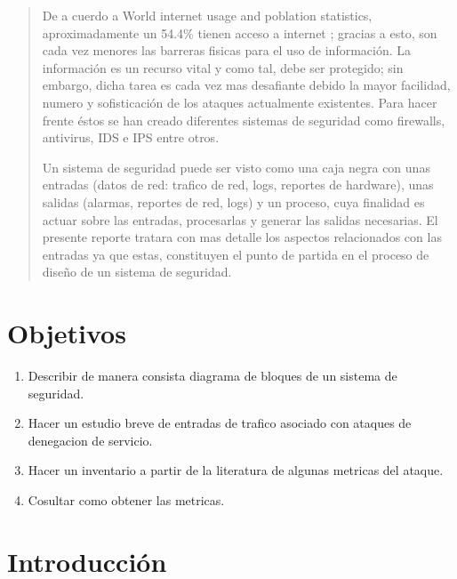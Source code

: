 \documentclass[12pt]{article}
\begin{document}
\tableofcontents
\newpage

\begin{abstract}

De a cuerdo a World internet usage and poblation statistics, aproximadamente un 54.4\% tienen acceso a internet \citep{internet_stats}; gracias a esto, son cada vez menores las barreras fisicas para el uso de información. La información es un recurso vital y como tal, debe ser protegido; sin embargo, dicha tarea es cada vez mas desafiante debido la mayor facilidad, numero y sofisticación de los ataques actualmente existentes. Para hacer frente éstos se han creado diferentes sistemas de seguridad como firewalls, antivirus, IDS e IPS entre otros.

Un sistema de seguridad puede ser visto como una caja negra con unas entradas (datos de red: trafico de red, logs, reportes de hardware), unas salidas (alarmas, reportes de red, logs) y un proceso, cuya finalidad es actuar sobre las entradas, procesarlas y generar las salidas necesarias. El presente reporte tratara con mas detalle los aspectos relacionados con las entradas ya que estas, constituyen el punto de partida en el proceso de diseño de un sistema de seguridad. 

\end{abstract}

\section{Objetivos}

\begin{enumerate}
\item Describir de manera consista diagrama de bloques de un sistema de seguridad.
\item Hacer un estudio breve de entradas de trafico asociado con ataques de denegacion de servicio.
\item Hacer un inventario a partir de la literatura de algunas metricas del ataque.
\item Cosultar como obtener las metricas.
\end{enumerate}

\section{Introducción}
\end{document}
